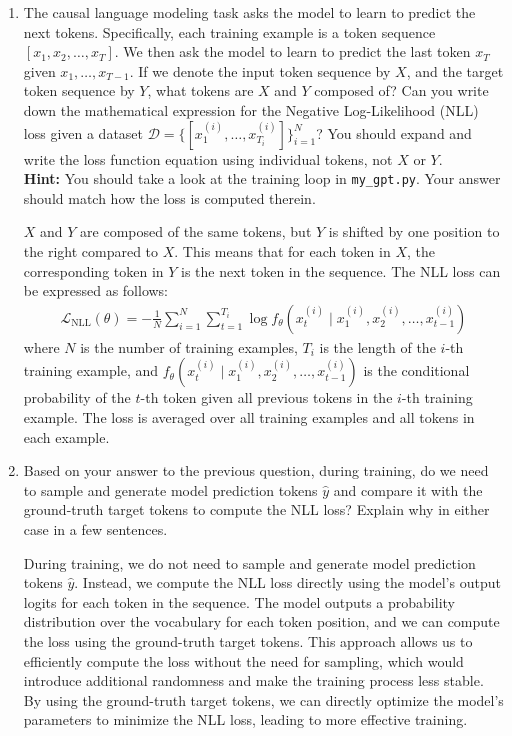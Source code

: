 \begin{enumerate}
\begin{enumerate}
    \item The causal language modeling task asks the model to learn to predict
    the next tokens. Specifically, each training example is a token sequence
    $[x_1, x_2, \dots, x_T]$. We then ask the model to learn to predict the last
    token $x_T$ given $x_1, \dots, x_{T-1}$. If we denote the input token
    sequence by $X$, and the target token sequence by $Y$, what tokens are $X$
    and $Y$ composed of? Can you write down the mathematical expression for the
    Negative Log-Likelihood (NLL) loss given a dataset $\mathcal{D} = \{
    [x^{(i)}_1, \dots, x^{(i)}_{T_i}] \}_{i=1}^N$? You should expand and write
    the loss function equation using individual tokens, not $X$ or $Y$. \\
    \textbf{Hint:} You should take a look at the training loop in
    \texttt{my\_gpt.py}. Your answer should match how the loss is computed
    therein.

    \begin{answerbox}[2.5in]
    $X$ and $Y$ are composed of the same tokens, but $Y$ is shifted by one position
    to the right compared to $X$. This means that for each token in $X$, the
    corresponding token in $Y$ is the next token in the sequence. The NLL loss
    can be expressed as follows:
    \begin{align*}
        \mathcal{L}_{\text{NLL}}(\theta) = -\frac{1}{N} \sum_{i=1}^{N} \sum_{t=1}^{T_i} \log f_{\theta}(x^{(i)}_t \mid x^{(i)}_1, x^{(i)}_2, \dots, x^{(i)}_{t-1})
    \end{align*}
    where $N$ is the number of training examples, $T_i$ is the length of the
    $i$-th training example, and $f_{\theta}(x^{(i)}_t \mid x^{(i)}_1, x^{(i)}_2,
    \dots, x^{(i)}_{t-1})$ is the conditional probability of the $t$-th token
    given all previous tokens in the $i$-th training example. The loss is
    averaged over all training examples and all tokens in each example.

    \end{answerbox}

    \item Based on your answer to the previous question, during training, do we need to sample and generate model prediction tokens $\hat{y}$ and compare it with the ground-truth target tokens to compute the NLL loss? Explain why in either case in a few sentences.
    \begin{answerbox}[1.5in]
    During training, we do not need to sample and generate model prediction tokens $\hat{y}$.
    Instead, we compute the NLL loss directly using the model's output logits for
    each token in the sequence. The model outputs a probability distribution over
    the vocabulary for each token position, and we can compute the loss using the
    ground-truth target tokens. This approach allows us to efficiently compute the
    loss without the need for sampling, which would introduce additional
    randomness and make the training process less stable. By using the ground-truth
    target tokens, we can directly optimize the model's parameters to minimize
    the NLL loss, leading to more effective training.


\end{answerbox}
\end{enumerate}
\end{enumerate}
